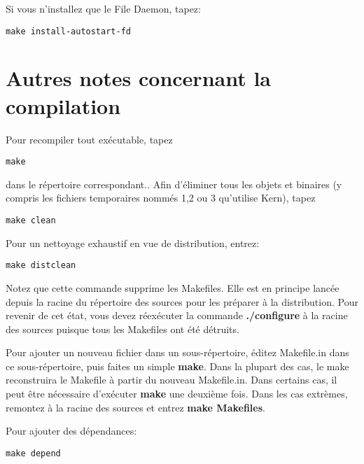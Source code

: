 {{{{{{{{{{Si vous n'installez que le File Daemon, tapez: 

\footnotesize
\begin{verbatim}
make install-autostart-fd
\end{verbatim}
\normalsize

\section{Autres notes concernant la compilation}

Pour recompiler tout ex\'ecutable, tapez 

\footnotesize
\begin{verbatim}
make
\end{verbatim}
\normalsize

dans le r\'epertoire correspondant.. Afin d'\'eliminer tous les objets et
binaires (y compris les fichiers temporaires nomm\'es 1,2 ou 3 qu'utilise
Kern), tapez 

\footnotesize
\begin{verbatim}
make clean
\end{verbatim}
\normalsize

Pour un nettoyage exhaustif en vue de distribution, entrez: 

\footnotesize
\begin{verbatim}
make distclean
\end{verbatim}
\normalsize

Notez que cette commande supprime les Makefiles. Elle est en principe
lanc\'ee depuis la racine du r\'epertoire des sources pour les pr\'eparer \`a
la distribution. Pour revenir de cet \'etat, vous devez r\'eex\'ecuter la
commande {\bf ./configure} \`a la racine des sources puisque tous les
Makefiles ont \'et\'e d\'etruits. 

Pour ajouter un nouveau fichier dans un sous-r\'epertoire, \'editez
Makefile.in dans ce sous-r\'epertoire, puis faites un simple {\bf make}. Dans
la plupart des cas, le make reconstruira le Makefile \`a partir du nouveau
Makefile.in. Dans certains cas, il peut \^etre n\'ecessaire d'ex\'ecuter {\bf
make} une deuxi\`eme fois. Dans les cas extr\`emes, remontez \`a la racine des
sources et entrez {\bf make Makefiles}. 

Pour ajouter des d\'ependances: 

\footnotesize
\begin{verbatim}
make depend
\end{verbatim}
\normalsize

}}}}}}}}}}
